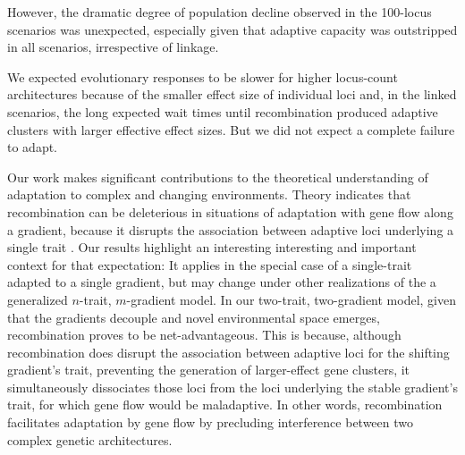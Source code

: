 \documentclass[9pt,twocolumn,twoside,lineno]{pnas-new}
\begin{document}
However, the dramatic degree of population decline observed in the 100-locus scenarios was unexpected,
especially given that adaptive capacity was outstripped in all scenarios, irrespective of 
linkage.

We expected evolutionary responses to be slower for higher locus-count architectures
because of the smaller effect size of individual loci and, in the linked scenarios,
the long expected wait times
until recombination produced adaptive clusters with larger effective effect sizes.
But we did not expect a complete failure to adapt.

Our work makes significant contributions to the theoretical understanding of 
adaptation to complex and changing environments.
Theory indicates that recombination can be deleterious
in situations of adaptation with gene flow
along a gradient, because it disrupts the association between adaptive loci 
underlying a single trait \cite{tigano}.
Our results highlight an interesting interesting and important context for that expectation:
It applies in the special case of a single-trait adapted to a single gradient,
but may change under other realizations of the
a generalized $n$-trait, $m$-gradient model.
In our two-trait, two-gradient model, given that the gradients decouple
and novel environmental space emerges,
recombination proves to be net-advantageous.
This is because, although recombination does disrupt the association between
adaptive loci for the shifting gradient's trait, preventing the
generation of larger-effect gene clusters,
it simultaneously dissociates those loci from the loci underlying
the stable gradient's trait, for which gene flow would be maladaptive.
In other words, recombination facilitates adaptation by gene flow
by precluding interference between two complex genetic architectures.
   
\end{document}
